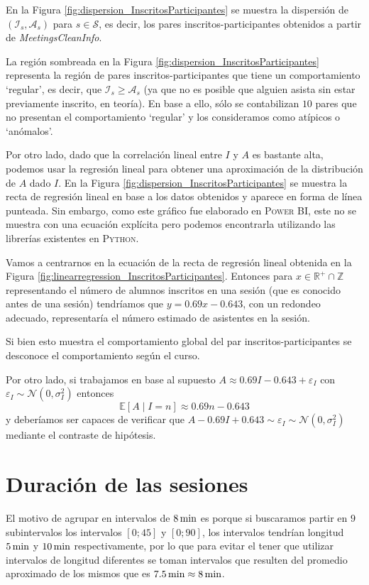 \documentclass[11pt,a4paper]{book}
\theoremstyle{definition}%
\newcommand{\Real}{\mathbb{R}}
\newcommand{\Integer}{\mathbb{Z}}
\newcommand{\EV}[1]{\mathbb{E}\left[#1\right]}
\begin{document}
                En la Figura \ref{fig:dispersion_InscritosParticipantes} se muestra la dispersión de $(\mathcal{I}_s,\mathcal{A}_s)$ para $s\in\mathcal{S}$, es decir, los pares inscritos-participantes obtenidos a partir de \textit{MeetingsCleanInfo}.
                
                La región sombreada en la Figura \ref{fig:dispersion_InscritosParticipantes} representa la región de pares inscritos-participantes que tiene un comportamiento `regular', es decir, que $\mathcal{I}_s\geq \mathcal{A}_s$ (ya que no es posible que alguien asista sin estar previamente inscrito, en teoría). En base a ello, sólo se contabilizan $10$ pares que no presentan el comportamiento `regular' y los consideramos como atípicos o `anómalos'.

                Por otro lado, dado que la correlación lineal entre $I$ y $A$ es bastante alta, podemos usar la regresión lineal para obtener una aproximación de la distribución de $A$ dado $I$. En la Figura \ref{fig:dispersion_InscritosParticipantes} se muestra la recta de regresión lineal en base a los datos obtenidos y aparece en forma de línea punteada. Sin embargo, como este gráfico fue elaborado en \textsc{Power BI}, este no se muestra con una ecuación explícita pero podemos encontrarla utilizando las librerías existentes en \textsc{Python}.

                Vamos a centrarnos en la ecuación de la recta de regresión lineal obtenida en la Figura \ref{fig:linearregression_InscritosParticipantes}. Entonces para $x\in\Real^+\cap\Integer$ representando el número de alumnos inscritos en una sesión (que es conocido antes de una sesión) tendríamos que $y=0.69x-0.643$, con un redondeo adecuado, representaría el número estimado de asistentes en la sesión.

                Si bien esto muestra el comportamiento global del par inscritos-participantes se desconoce el comportamiento según el curso.

                Por otro lado, si trabajamos en base al supuesto $A\approx0.69I-0.643+\varepsilon_I$ con $\varepsilon_I\sim\mathcal{N}(0,\sigma_I^2)$ entonces
                \begin{equation*}
                    \EV{A\mid I=n}\approx 0.69n-0.643
                \end{equation*}
                y deberíamos ser capaces de verificar que $A-0.69I+0.643\sim\varepsilon_I\sim\mathcal{N}(0,\sigma_I^2)$ mediante el contraste de hipótesis.

        \section{Duración de las sesiones}
            El motivo de agrupar en intervalos de $8\,\textup{min}$ es porque si buscaramos partir en $9$ subintervalos los intervalos $[0;45]$ y $[0;90]$, los intervalos tendrían longitud $5\,\textup{min}$ y $10\,\textup{min}$ respectivamente, por lo que para evitar el tener que utilizar intervalos de longitud diferentes se toman intervalos que resulten del promedio aproximado de los mismos que es $7.5\,\textup{min}\approx8\,\textup{min}$.
\end{document}
